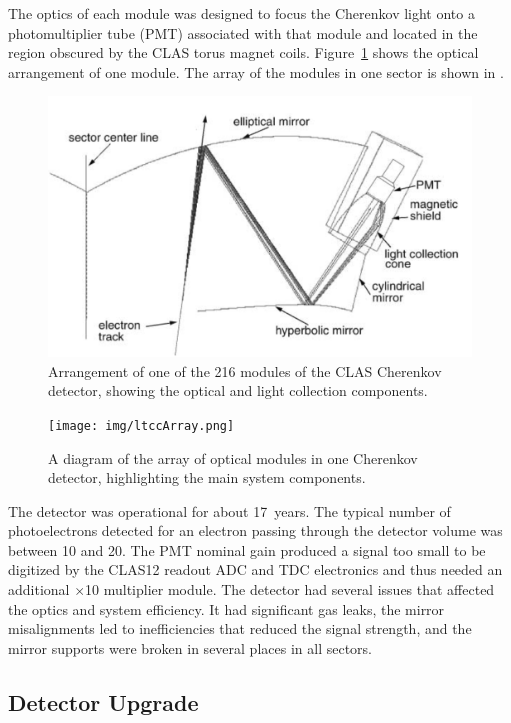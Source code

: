 The optics of each module was designed to focus the Cherenkov light onto a photomultiplier tube (PMT) associated
with that module and located in the region obscured by the CLAS torus magnet coils. Figure~\ref{fig:optics} shows
the optical arrangement of one module. The array of the modules in one sector is shown in .

\begin{figure}[ht]
	\centering
	\includegraphics[width=1.0\columnwidth,keepaspectratio]{img/optics.png}
	\caption{Arrangement of one of the 216 modules of the CLAS Cherenkov detector, showing the optical and
          light collection components.}
	\label{fig:optics}
\end{figure}

\begin{figure}[ht]
	\centering
	\texttt{[image: img/ltccArray.png]}
	\caption{A diagram of the array of optical modules in one Cherenkov detector, highlighting
          the main system components.}
	\label{fig:ltccArray}
\end{figure}

The detector was operational for about 17~years. The typical number of photoelectrons detected for an electron
passing through the detector volume was between 10 and 20. The PMT nominal gain produced a signal too small
to be digitized by the CLAS12 readout ADC and TDC electronics and thus needed an additional $\times$10
multiplier module. The detector had several issues that affected the optics and system efficiency. It had 
significant gas leaks, the mirror misalignments led to inefficiencies that reduced the signal strength, and the
mirror supports were broken in several places in all sectors.

\subsection{Detector Upgrade}

